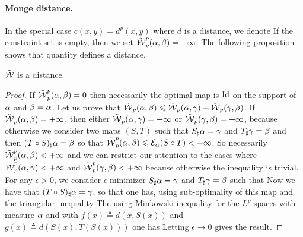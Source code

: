 \paragraph{Monge distance.}

In the special case $c(x,y)=d^p(x,y)$ where $d$ is a distance, we denote 
If the constraint set is empty, then we set $\tilde {\operatorname{\mathcal{W}}}_p^p(\alpha,\beta) = +\infty$.
%
The following proposition shows that quantity defines a distance.

\begin{prop}
	$\tilde {\operatorname{\mathcal{W}}}$ is a distance.
\end{prop}
\begin{proof}
	If $\tilde {\operatorname{\mathcal{W}}}_p^p(\alpha,\beta)=0$ then necessarily the optimal map is $\mathrm{Id}$ on the support of $\alpha$ and $\beta=\alpha$.
	Let us prove that $\tilde {\operatorname{\mathcal{W}}}_p(\alpha,\beta) \leqslant \tilde {\operatorname{\mathcal{W}}}_p(\alpha,\gamma)+\tilde {\operatorname{\mathcal{W}}}_p(\gamma,\beta)$.
	If $\tilde {\operatorname{\mathcal{W}}}_p(\alpha,\beta)=+\infty$, then either $\tilde {\operatorname{\mathcal{W}}}_p(\alpha,\gamma)=+\infty$ or $\tilde {\operatorname{\mathcal{W}}}_p(\gamma,\beta)=+\infty$, because otherwise we consider two maps $(S,T)$ such that $S_\sharp \alpha=\gamma$ and $T_\sharp \gamma=\beta$ and then $(T \circ S)_\sharp \alpha = \beta$ so that 
	$\tilde {\operatorname{\mathcal{W}}}_p^p(\alpha,\beta) \leqslant \mathcal{E}_\alpha(S \circ T) < +\infty$.
	So necessarily $\tilde {\operatorname{\mathcal{W}}}_p^p(\alpha,\beta)<+\infty$ and we can restrict our attention to the cases 
	where $\tilde {\operatorname{\mathcal{W}}}_p^p(\alpha,\gamma)<+\infty$ and $\tilde {\operatorname{\mathcal{W}}}_p^p(\gamma,\beta)<+\infty$ because otherwise the inequality is trivial.
	For any $\epsilon>0$, we consider $\epsilon$-minimizer $S_\sharp \alpha=\gamma$ and $T_\sharp \gamma=\beta$ such that
	Now we have that $(T \circ S)_\sharp \alpha=\gamma$, so that 
	one has, using sub-optimality of this map and the triangular inequality 
	The using Minkowski inequality for the $L^p$ spaces with measure $\alpha$ 
	and with $f(x) \triangleq d(x,S(x))$ and $g(x) \triangleq d(S(x),T(S(x)))$
	one has
	Letting $\epsilon \rightarrow 0$ gives the result. 
\end{proof}

